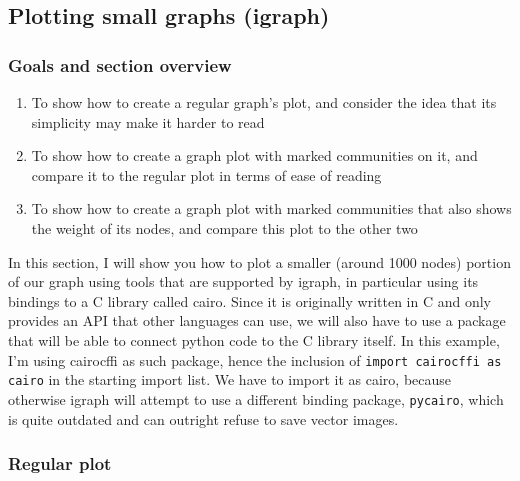 \documentclass[12pt, a4paper]{article}
\begin{document}
\newpage
\subsection{Plotting small graphs (igraph)}
\subsubsection{Goals and section overview}

\begin{enumerate}
  \item To show how to create a regular graph's plot, and consider the idea that its simplicity may make it harder to read
  \item To show how to create a graph plot with marked communities on it, and compare it to the regular plot in terms of ease of reading
  \item To show how to create a graph plot with marked communities that also shows the weight of its nodes, and compare this plot to the other two
\end{enumerate}


In this section, I will show you how to plot a smaller (around 1000 nodes) portion of our graph using tools that are supported by igraph, in particular using its bindings to a C library called  cairo. Since it is originally written in C and only provides an API that other languages can use, we will also have to use a package that will be able to connect python code to the C library itself. In this example, I'm using cairocffi as such package, hence the inclusion of \texttt{import cairocffi as cairo} in the starting import list. We have to import it as cairo, because otherwise igraph will attempt to use a different binding package, \texttt{pycairo}, which is quite outdated and can outright refuse to save vector images.

\subsubsection{Regular plot}
\end{document}
